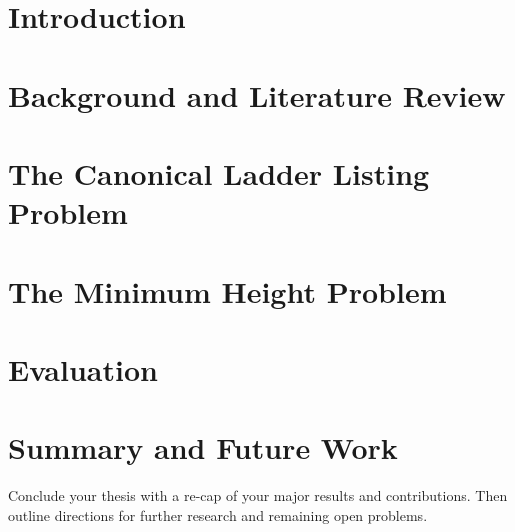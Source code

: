 



\chapter{Introduction}
\label{chapter:intro}









\chapter{Background and Literature Review}
\label{chapter:Background}



\chapter{The Canonical Ladder Listing Problem}  
\label{chapter:listingproblem}





\chapter{The Minimum Height Problem}
\label{chapter:minheightproblem}







\chapter{Evaluation}  
\label{chapter:evaluation}



\chapter{Summary and Future Work}
\label{chapter:summary}

Conclude your thesis with a re-cap of your major results and contributions.  Then outline directions for further research and remaining open problems.

